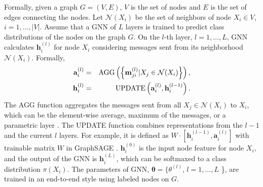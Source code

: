 Formally, 
given a graph $G=(V, E)$, $V$ is the set of nodes and $E$ is the set of edges connecting the nodes. 
Let $\mathcal{N}(X_i)$ be the set of neighbors of node $X_i\in V$, $i=1,\dots, |V|$.
Assume that a GNN of $L$ layers is trained to predict class distributions of the nodes on the graph $G$.
On the $l$-th layer, $l=1,\dots, L$, 
GNN calculates $\mathbf{h}_i^{(l)}$ for node $X_i$ considering messages sent from its neighborhood $\mathcal{N}(X_i)$.
Formally,
\begin{eqnarray}
\mathbf{a}^{(l)}_i & = & \textnormal{AGG}\left(\left\{\mathbf{m}^{(l)}_{ji}|X_j \in \mathcal{N}(X_i)\right\}\right),\\
\mathbf{h}^{(l)}_i & = & \textnormal{UPDATE}\left(\mathbf{a}^{(l)}_i, \mathbf{h}^{(l-1)}_i \right).
\end{eqnarray}
The AGG function aggregates the messages sent from all $X_j\in \mathcal{N}(X_i)$ to $X_i$, which can be the element-wise average, maximum of the messages, or a parametric layer \cite{xu2018powerful}.
The UPDATE function combines representations from the $l-1$ and the current $l$ layers.
For example, it is defined as $W\cdot \left[ \mathbf{h}_i^{(l-1)}, \mathbf{a}_i^{(l)} \right]$ with trainable matrix $W$ in GraphSAGE \cite{hamilton2017inductive}.
$\mathbf{h}^{(0)}_i$ is the input node feature for node $X_i$, 
and the output of the GNN is $\mathbf{h}_i^{(L)}$, which can be softmaxed to a class distribution $\pi(X_i)$.
The parameters of GNN, $\boldsymbol{\theta} = \{ \theta^{(l)}$, $l=1,\dots,L$ \},
are trained in an end-to-end style using labeled nodes on $G$.
